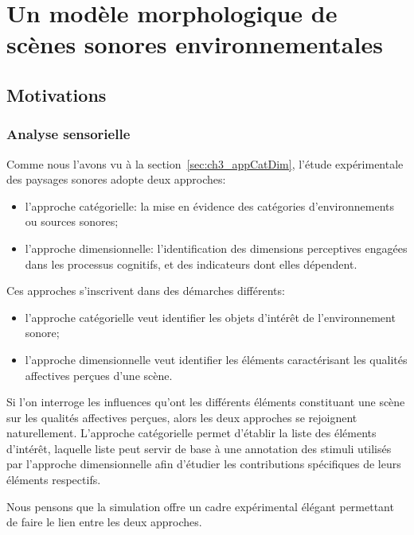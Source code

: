 \chapter[Un modèle morphologique]{Un modèle morphologique de scènes sonores environnementales}\label{ch:psycho_model} %

\section{Motivations}

\subsection{Analyse sensorielle}
\label{sec:ch4_anaSo}

Comme nous l'avons vu à la section~\ref{sec:ch3_appCatDim}, l'étude expérimentale des paysages sonores adopte deux approches:

\begin{itemize}
\item l'approche catégorielle: la mise en évidence des catégories d'environnements ou sources sonores;
\item l'approche dimensionnelle: l'identification des dimensions perceptives engagées dans les processus cognitifs, et des indicateurs dont elles dépendent.
\end{itemize}

Ces approches s'inscrivent dans des démarches différents:

\begin{itemize}
\item l'approche catégorielle veut identifier les objets d'intérêt  de l'environnement sonore;
\item l'approche dimensionnelle veut identifier les éléments caractérisant les qualités affectives perçues d'une scène.
\end{itemize}

Si l'on interroge les influences qu'ont les différents éléments constituant une scène sur les qualités affectives perçues, alors les deux approches se rejoignent naturellement. L'approche catégorielle permet d'établir la liste des éléments d'intérêt, laquelle liste peut servir de base à une annotation des stimuli utilisés par l'approche dimensionnelle afin d'étudier les contributions spécifiques de leurs éléments respectifs.

Nous pensons que la simulation offre un cadre expérimental élégant permettant de faire le lien entre les deux approches.

